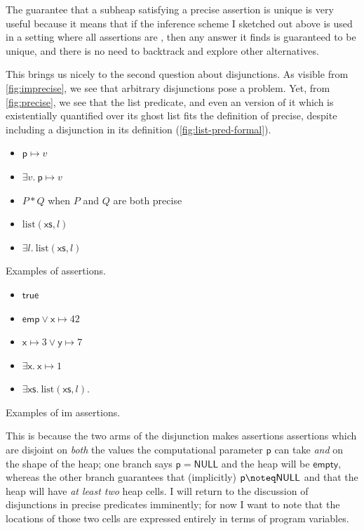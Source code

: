 The guarantee that a subheap satisfying a precise assertion is unique is very
useful because it means that if the inference scheme I sketched out above is
used in a setting where all assertions are , then any answer it
finds is guaranteed to be unique, and there is no need to backtrack and explore
other alternatives.

This brings us nicely to the second question about disjunctions. As visible
from \cref{fig:imprecise}, we see that arbitrary disjunctions pose a problem.
Yet, from \cref{fig:precise}, we see that the list predicate, and even an
version of it which is existentially quantified over its ghost list fits the
definition of precise, despite including a disjunction in its definition
(\cref{fig:list-pred-formal}).

\begin{marginfigure}
\begin{itemize}
    \item $\mathsf{p} \mapsto{} v$
    \item $\exists v.\ \mathsf{p} \mapsto{} v$
    \item $P \ast{} Q$ when $P$ and $Q$ are both precise
    \item $\mathrm{list}(\mathsf{xs}, l)$
    \item $\exists l.\ \mathrm{list}(\mathsf{xs}, l)$
\end{itemize}
\caption{Examples of  assertions.}\label{fig:precise}
\end{marginfigure}

\begin{marginfigure}
\begin{itemize}
    \item $\mathsf{true}$
    \item $\mathsf{emp} \vee{} \mathsf{x} \mapsto{} 42$
    \item $\mathsf{x} \mapsto{} 3 \vee{} \mathsf{y} \mapsto{} 7$
    \item $\exists \mathsf{x}.\ \mathsf{x} \mapsto{} 1$
    \item $\exists \mathsf{xs}.\ \mathrm{list}(\mathsf{xs}, l)$.
\end{itemize}
\caption{Examples of im assertions.}\label{fig:imprecise}
\end{marginfigure}

This is because the two arms of the disjunction makes assertions assertions
which are disjoint on \emph{both} the values the computational parameter
$\mathsf{p}$ can take \emph{and} on the shape of the heap; one branch says
$\mathsf{p} = \mathsf{NULL}$ and the heap will be $\mathsf{empty}$, whereas the
other branch guarantees that (implicitly) $\mathsf{p} \noteq \mathsf{NULL}$ and
that the heap will have \emph{at least two} heap cells. I will return to the
discussion of disjunctions in precise predicates imminently; for now I want to
note that the locations of those two cells are expressed entirely in terms of
program variables.

